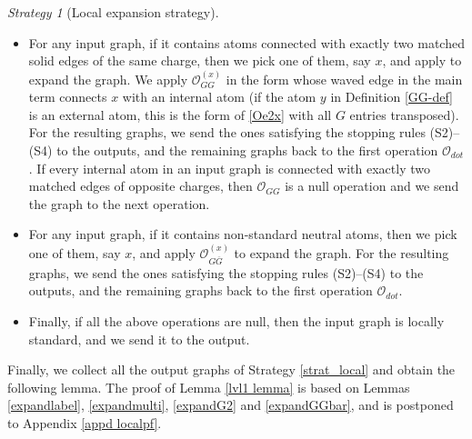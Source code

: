 \documentclass{article}
\newcommand{\1}{\mathds{1}}
\numberwithin{equation}{section}
\renewcommand{\cal}{\mathcal}
\theoremstyle{plain} %
\theoremstyle{remark}
\newtheorem{strategy}[theorem]{Strategy}
\begin{document}
\begin{strategy}[Local expansion strategy]
\begin{itemize}
\item[(4)] For any input graph, if it contains atoms connected with exactly two matched solid edges of the same charge, then we pick one of them, say $x$, and apply \smash{$\cal O_{GG}^{(x)}$} to expand the graph. We apply $\cal O_{GG}^{(x)}$ in the form whose waved edge in the main term connects $x$ with an internal atom (if the atom $y$ in Definition \ref{GG-def} is an external atom, this is the form of \eqref{Oe2x} with all $G$ entries transposed). For the resulting graphs, we send the ones satisfying the stopping rules (S2)--(S4) to the outputs, and the remaining graphs back to the first operation $\cal O_{dot}$. If every internal atom in an input graph is connected with exactly two matched edges of opposite charges, then $\cal O_{GG}$ is a null operation and we send the graph to the next operation.  

\item[(5)] For any input graph, if it contains non-standard neutral atoms, then we pick one of them, say $x$, and apply {$\cal O_{G\overline G}^{(x)}$} to expand the graph. For the resulting graphs, we send the ones satisfying the stopping rules (S2)--(S4) to the outputs, and the remaining graphs back to the first operation $\cal O_{dot}$. %

\item[(6)] Finally, if all the above operations are null, then the input graph is locally standard, and we send it to the output.  
\end{itemize}
\end{strategy}

Finally, we collect all the output graphs of Strategy \ref{strat_local} and obtain the following lemma. The proof of Lemma \ref{lvl1 lemma} is based on Lemmas \ref{expandlabel}, \ref{expandmulti}, \ref{expandG2} and \ref{expandGGbar}, and is postponed to Appendix \ref{appd localpf}.  

 
\end{document}

